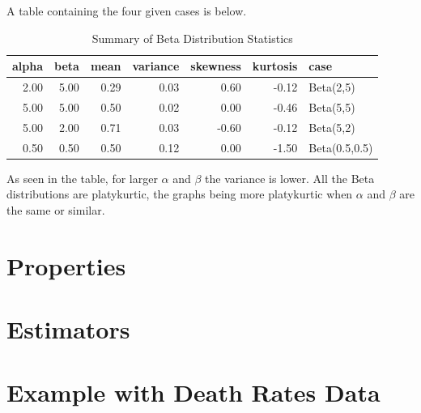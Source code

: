 \documentclass{article}\usepackage[]{graphicx}\usepackage[]{xcolor}
\begin{document}
\begin{multicols}{2}
A table containing the four given cases is below.


\begin{table}[H]
\centering
\begingroup\small
\begin{tabular}{rrrrrrl}
  \hline
alpha & beta & mean & variance & skewness & kurtosis & case \\ 
  \hline
2.00 & 5.00 & 0.29 & 0.03 & 0.60 & -0.12 & Beta(2,5) \\ 
  5.00 & 5.00 & 0.50 & 0.02 & 0.00 & -0.46 & Beta(5,5) \\ 
  5.00 & 2.00 & 0.71 & 0.03 & -0.60 & -0.12 & Beta(5,2) \\ 
  0.50 & 0.50 & 0.50 & 0.12 & 0.00 & -1.50 & Beta(0.5,0.5) \\ 
   \hline
\end{tabular}
\endgroup
\caption{Summary of Beta Distribution Statistics} 
\end{table}

As seen in the table, for larger \(\alpha\) and \(\beta\) the variance is lower. All the Beta distributions are platykurtic, the graphs being more platykurtic when \(\alpha\) and \(\beta\) are the same or similar. 

\section{Properties}

\section{Estimators}

\section{Example with Death Rates Data}

\begin{tiny}

\end{tiny}
\end{multicols}
\end{document}

